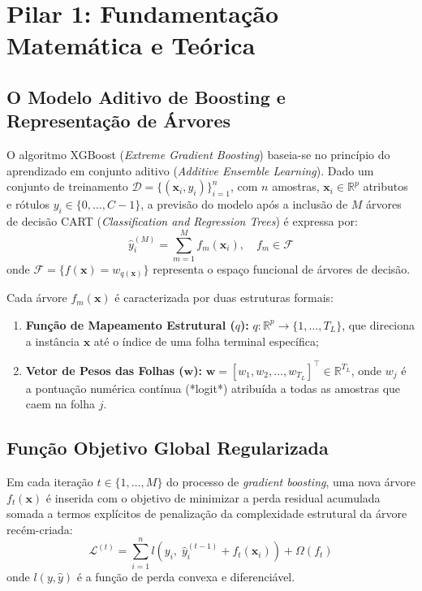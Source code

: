 \documentclass[11pt,a4paper]{article}
\begin{document}
\vspace{0.2cm}
\tableofcontents
\vspace{0.4cm}
\newpage

\section{Pilar 1: Fundamentação Matemática e Teórica}

\subsection{O Modelo Aditivo de Boosting e Representação de Árvores}
O algoritmo XGBoost (\textit{Extreme Gradient Boosting}) baseia-se no princípio do aprendizado em conjunto aditivo (\textit{Additive Ensemble Learning}). Dado um conjunto de treinamento $\mathcal{D} = \{(\mathbf{x}_i, y_i)\}_{i=1}^n$, com $n$ amostras, $\mathbf{x}_i \in \mathbb{R}^p$ atributos e rótulos $y_i \in \{0, \dots, C-1\}$, a previsão do modelo após a inclusão de $M$ árvores de decisão CART (\textit{Classification and Regression Trees}) é expressa por:
\begin{equation}
  \hat{y}_i^{(M)} = \sum_{m=1}^M f_m(\mathbf{x}_i), \quad f_m \in \mathcal{F}
  \label{eq:additive_model}
\end{equation}
onde $\mathcal{F} = \{ f(\mathbf{x}) = w_{q(\mathbf{x})} \}$ representa o espaço funcional de árvores de decisão.

Cada árvore $f_m(\mathbf{x})$ é caracterizada por duas estruturas formais:
\begin{enumerate}
  \item \textbf{Função de Mapeamento Estrutural ($q$):} $q: \mathbb{R}^p \to \{1, \dots, T_L\}$, que direciona a instância $\mathbf{x}$ até o índice de uma folha terminal específica;
  \item \textbf{Vetor de Pesos das Folhas ($\mathbf{w}$):} $\mathbf{w} = [w_1, w_2, \dots, w_{T_L}]^\top \in \mathbb{R}^{T_L}$, onde $w_j$ é a pontuação numérica contínua (*logit*) atribuída a todas as amostras que caem na folha $j$.
\end{enumerate}

\subsection{Função Objetivo Global Regularizada}
Em cada iteração $t \in \{1, \dots, M\}$ do processo de \textit{gradient boosting}, uma nova árvore $f_t(\mathbf{x})$ é inserida com o objetivo de minimizar a perda residual acumulada somada a termos explícitos de penalização da complexidade estrutural da árvore recém-criada:
\begin{equation}
  \mathcal{L}^{(t)} = \sum_{i=1}^n l\left(y_i, \; \hat{y}_i^{(t-1)} + f_t(\mathbf{x}_i)\right) + \Omega(f_t)
  \label{eq:xgb_obj_regularizada}
\end{equation}
onde $l(y, \hat{y})$ é a função de perda convexa e diferenciável.
\end{document}
